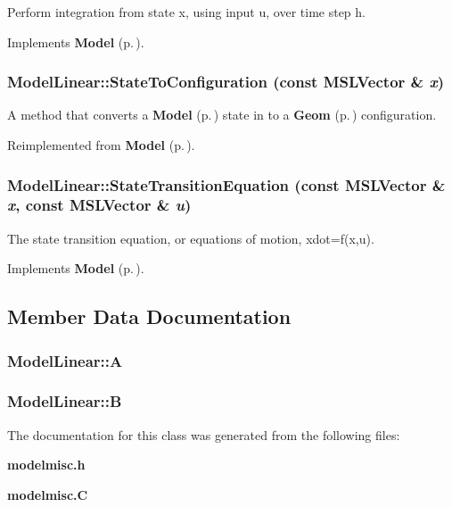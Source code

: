 Perform integration from state x, using input u, over time step h.



Implements {\bf Model} {\rm (p.\,\pageref{classModel_a5})}.
\subsubsection{ Model\-Linear::State\-To\-Configuration (const {\bf MSLVector} \& {\em x})\hspace{0.3cm}{\tt  [virtual]}}\label{classModelLinear_a2}


A method that converts a {\bf Model} {\rm (p.\,\pageref{classModel})} state in to a {\bf Geom} {\rm (p.\,\pageref{classGeom})} configuration.



Reimplemented from {\bf Model} {\rm (p.\,\pageref{classModel_a8})}.
\subsubsection{ Model\-Linear::State\-Transition\-Equation (const {\bf MSLVector} \& {\em x}, const {\bf MSLVector} \& {\em u})\hspace{0.3cm}{\tt  [virtual]}}\label{classModelLinear_a4}


The state transition equation, or equations of motion, xdot=f(x,u).



Implements {\bf Model} {\rm (p.\,\pageref{classModel_a3})}.

\subsection{Member Data Documentation}
\subsubsection{ Model\-Linear::A}\label{classModelLinear_m0}


\subsubsection{ Model\-Linear::B}\label{classModelLinear_m1}




The documentation for this class was generated from the following files:\begin{CompactItemize}
\item 
{\bf modelmisc.h}\item 
{\bf modelmisc.C}\end{CompactItemize}
